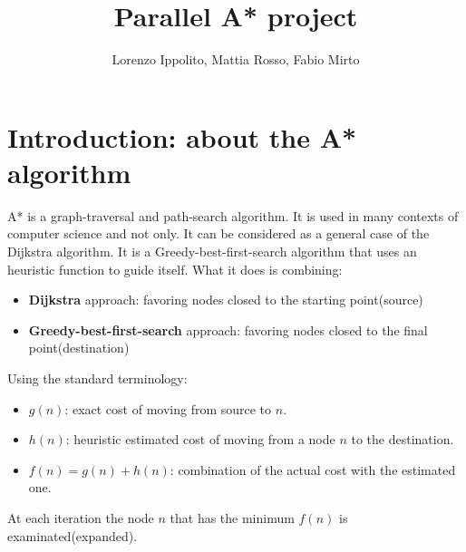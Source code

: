 \documentclass[twocolumn, switch]{article} %
\title{Parallel A* project}
\author{Lorenzo Ippolito, Mattia Rosso, Fabio Mirto}
\begin{document}




\section{Introduction: about the A* algorithm}
A* is a graph-traversal and path-search algorithm. It is used in many contexts of computer science and 
not only. It can be considered as a general case of the Dijkstra algorithm. It is a Greedy-best-first-search algorithm that uses an heuristic function to guide
itself. What it does is combining:
\begin{itemize}
  \item \textbf{Dijkstra} approach: favoring nodes closed to the starting point(source)
  \item \textbf{Greedy-best-first-search} approach: favoring nodes closed to the final point(destination)
\end{itemize}
Using the standard terminology:
\begin{itemize}
  \item $g(n)$: exact cost of moving from source to $n$.
  \item $h(n)$: heuristic estimated cost of moving from a node $n$ to the destination.
  \item $f(n) = g(n) + h(n)$: combination of the actual cost with the estimated one.
\end{itemize}
At each iteration the node $n$ that has the minimum $f(n)$ is examinated(expanded).
\end{document}
